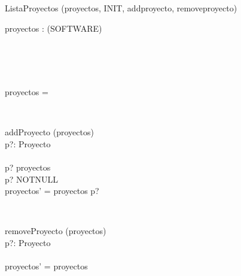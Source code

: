 \documentclass[11pt]{article}
\begin{document}
\begin{class}{ListaProyectos}
\ires(proyectos, INIT, addproyecto, removeproyecto)\\
\begin{axdef}
proyectos : \pset(SOFTWARE)\\
\ST\\
\\
\end{axdef} \\
\begin{init}
proyectos = \emptyset\\
\end{init} \\
\begin{op}{addProyecto}
\Delta (proyectos) \\
p?: Proyecto\\
\ST\\
p? \notin proyectos \land\\
p? \neq NOTNULL \land\\
proyectos' = proyectos \union p?\\
\end{op}\\
\begin{op}{removeProyecto}
\Delta (proyectos) \\
p?: Proyecto\\
\ST\\
proyectos' = proyectos \\
\end{op}\\
\end{class}\\
\end{document}
